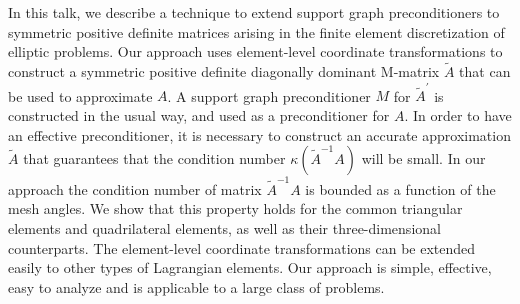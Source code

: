 \documentclass{report}
\begin{document}
In this talk, we describe a technique to extend support graph
preconditioners to symmetric positive definite matrices arising in the
finite element discretization of elliptic problems. Our approach uses
element-level coordinate transformations to construct a symmetric
positive definite diagonally dominant M-matrix $\tilde{A}$ that can be
used to approximate $A$. A support graph preconditioner $M$ for
$\tilde{A}^{\prime}$ is constructed in the usual way, and used as a
preconditioner for $A$. In order to have an effective preconditioner, it
is necessary to construct an accurate approximation $\tilde{A}$ that
guarantees that the condition number $\kappa(\tilde{A}^{-1}A)$ will be
small. In our approach the condition number of matrix $\tilde{A}^{-1}A$
is bounded as a function of the mesh angles. We show that this property
holds for the common triangular elements and quadrilateral elements, as
well as their three-dimensional counterparts. The element-level
coordinate transformations can be extended easily to other types of
Lagrangian elements. Our approach is simple, effective, easy to analyze
and is applicable to a large class of problems.
\end{document}
